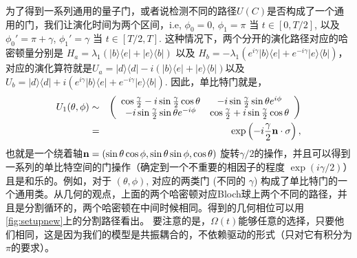 \documentclass[supercite]{HustGraduPaper}
\begin{document}
为了得到一系列通用的量子门，或者说检测不同的路径$U(C)$是否构成了一个通用的门，我们让演化时间为两个区间，i.e, $\phi_0=0$, $\phi_1= \pi$ 当 $t\in [0, T/2]$, 以及 $\phi_0'=\pi+ \gamma$,  $\phi_1'= \gamma$  当 $t\in [T/2, T]$. 这种情况下，两个分开的演化路径对应的哈密顿量分别是
 $H_a=\lambda_1(|b\rangle\langle e|+ |e\rangle\langle b|)$ 以及 $H_b=-\lambda_1 (e^{i\gamma} |b\rangle\langle e|+ e^{-i\gamma} |e\rangle\langle b|)$，
 对应的演化算符就是$U_a=|d\rangle\langle d| -i (|b\rangle\langle e|+ |e\rangle\langle b|)$以及$U_b=|d\rangle\langle d| + i (e^{i\gamma} |b\rangle\langle e|+ e^{-i\gamma} |e\rangle\langle b|)$. 因此，单比特门就是，
\begin{eqnarray}\label{singleloop}
U_1(\theta,\phi) &\sim& \left(\begin{array}{cc}
\cos \frac{\gamma}{2}-i\sin\frac{\gamma}{2}\cos\theta & -i\sin\frac{\gamma}{2}\sin\theta e^{i\phi}\\
-i \sin\frac{\gamma}{2}\sin\theta e^{-i\phi} &\cos\frac{\gamma}{2}+i\sin\frac{\gamma}{2}\cos\theta
\end{array}\right) \nonumber \\
&=& \exp\left({-i{\gamma \over 2} {\bf n}\cdot{\bf \sigma}}\right),
\end{eqnarray}
也就是一个绕着轴${\bf n}= (\sin\theta\cos\phi, \sin\theta\sin\phi, \cos\theta)$ 旋转$\gamma/2$的操作，并且可以得到一系列的单比特空间的门操作（确定到一个不重要的相因子的程度 $\exp(i\gamma/ 2)$）且是和乐的。例如，对于 $(\theta, \phi)$, 对应的两类门 (不同的 $\gamma$) 构成了单比特门的一个通用类。从几何的观点，上面的两个哈密顿对应Bloch球上两个不同的路径，并且是分割循环的，两个哈密顿在中间时候相同。得到的几何相位可以用\ref{fig:setupnew}上的分割路径看出。 要注意的是，$\Omega(t)$能够任意的选择，只要他们相同，这是因为我们的模型是共振耦合的，不依赖驱动的形式（只对它有积分为$\pi$的要求）。
\end{document}
